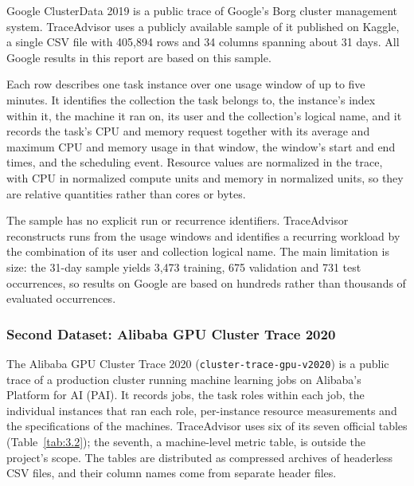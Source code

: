 Google ClusterData 2019 is a public trace of Google's Borg cluster management system. TraceAdvisor uses a publicly available sample of it published on Kaggle, a single CSV file with 405,894 rows and 34 columns spanning about 31 days. All Google results in this report are based on this sample.

Each row describes one task instance over one usage window of up to five minutes. It identifies the collection the task belongs to, the instance's index within it, the machine it ran on, its user and the collection's logical name, and it records the task's CPU and memory request together with its average and maximum CPU and memory usage in that window, the window's start and end times, and the scheduling event. Resource values are normalized in the trace, with CPU in normalized compute units and memory in normalized units, so they are relative quantities rather than cores or bytes.

The sample has no explicit run or recurrence identifiers. TraceAdvisor reconstructs runs from the usage windows and identifies a recurring workload by the combination of its user and collection logical name. The main limitation is size: the 31-day sample yields 3,473 training, 675 validation and 731 test occurrences, so results on Google are based on hundreds rather than thousands of evaluated occurrences.

\subsubsection{Second Dataset: Alibaba GPU Cluster Trace 2020}\label{sec:3.3.2}

The Alibaba GPU Cluster Trace 2020 (\texttt{cluster-trace-gpu-v2020}) is a public trace of a production cluster running machine learning jobs on Alibaba's Platform for AI (PAI). It records jobs, the task roles within each job, the individual instances that ran each role, per-instance resource measurements and the specifications of the machines. TraceAdvisor uses six of its seven official tables (Table~\ref{tab:3.2}); the seventh, a machine-level metric table, is outside the project's scope. The tables are distributed as compressed archives of headerless CSV files, and their column names come from separate header files.

